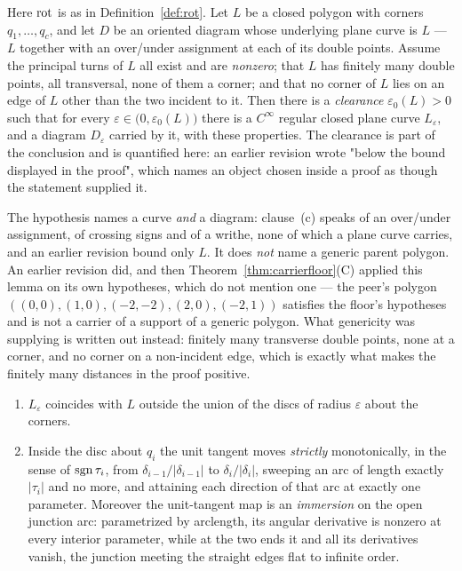 \begin{lemma}[rounding]\label{lem:rounding}
Here $\operatorname{rot}$ is as in Definition~\ref{def:rot}.
Let $L$ be a closed polygon with corners $q_1,\dots,q_c$, and let $D$ be an
oriented diagram whose underlying plane curve is $L$ --- $L$ together with an
over/under assignment at each of its double points. Assume the principal turns
of $L$ all exist and are \emph{nonzero}; that $L$ has finitely many double
points, all transversal, none of them a corner; and that no corner of $L$ lies
on an edge of $L$ other than the two incident to it. Then there is a \emph{clearance} $\varepsilon_0(L)>0$ such that for every
$\varepsilon\in\bigl(0,\varepsilon_0(L)\bigr)$ there is a $C^\infty$ regular
closed plane curve $L_\varepsilon$, and a diagram $D_\varepsilon$ carried by it, with
these properties. The clearance is part of the conclusion and is quantified
here: an earlier revision wrote "below the bound displayed in the proof", which
names an object chosen inside a proof as though the statement supplied it.

The hypothesis names a curve \emph{and} a diagram: clause~(c) speaks of an
over/under assignment, of crossing signs and of a writhe, none of which a plane
curve carries, and an earlier revision bound only $L$. It does \emph{not} name a
generic parent polygon. An earlier revision did, and then
Theorem~\ref{thm:carrierfloor}(C) applied this lemma on its own hypotheses, which
do not mention one --- the peer's polygon $((0,0),(1,0),(-2,-2),(2,0),(-2,1))$
satisfies the floor's hypotheses and is not a carrier of a support of a generic
polygon. What genericity was supplying is written out instead: finitely many
transverse double points, none at a corner, and no corner on a non-incident
edge, which is exactly what makes the finitely many distances in the proof
positive.
\begin{enumerate}
\item[(a)] $L_\varepsilon$ coincides with $L$ outside the union of the discs of
radius $\varepsilon$ about the corners.
\item[(b)] Inside the disc about $q_i$ the unit tangent moves \emph{strictly}
monotonically, in the sense of $\operatorname{sgn}\tau_i$, from $\delta_{i-1}/|\delta_{i-1}|$
to $\delta_i/|\delta_i|$, sweeping an arc of length exactly $|\tau_i|$ and no
more, and attaining each direction of that arc at exactly one parameter.
Moreover the unit-tangent map is an \emph{immersion} on the open junction arc:
parametrized by arclength, its angular derivative is nonzero at every interior
parameter, while at the two ends it and all its derivatives vanish, the
junction meeting the straight edges flat to infinite order.


\end{enumerate}
\end{lemma}
